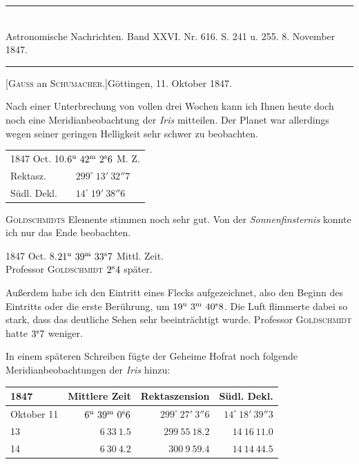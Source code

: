 \clearpage
{}
\begin{center}
\rule{0.55\linewidth}{0.4pt}\\[2pt]
Astronomische Nachrichten. Band XXVI. Nr. 616. S. 241 u. 255. 8. November 1847.\\[2pt]
\rule{0.55\linewidth}{0.4pt}
\end{center}
\begin{center}[\textsc{Gauss} an \textsc{Schumacher}.]\quad Göttingen, 11. Oktober 1847.\end{center}

Nach einer Unterbrechung von vollen drei Wochen kann ich Ihnen heute doch noch eine Meridianbeobachtung der \emph{Iris} mitteilen. Der Planet war allerdings wegen seiner geringen Helligkeit sehr schwer zu beobachten.

\begin{center}
\begin{tabular}{ll}
\multicolumn{2}{l}{1847 Oct. 10.\quad $6^{\rm u}\ 42^{\rm m}\ 2^{\rm s}6$ M. Z.} \\
Rektasz. & $299^\circ\ 13'\ 32''7$ \\
Südl. Dekl. & $14^\circ\ 19'\ 38''6$ \\
\end{tabular}
\end{center}

\textsc{Goldschmidts} Elemente stimmen noch sehr gut. Von der \emph{Sonnenfinsternis} konnte ich nur das Ende beobachten.

\begin{center}
1847 Oct. 8.\quad $21^{\rm u}\ 39^{\rm m}\ 33^{\rm s}7$ Mittl. Zeit.\\
Professor \textsc{Goldschmidt} $2^{\rm s}4$ später.
\end{center}

Außerdem habe ich den Eintritt eines Flecks aufgezeichnet, also den Beginn des Eintritts oder die erste Berührung, um $19^{\rm u}\ 3^{\rm m}\ 40^{\rm s}8$. Die Luft flimmerte dabei so stark, dass das deutliche Sehen sehr beeinträchtigt wurde. Professor \textsc{Goldschmidt} hatte $3^{\rm s}7$ weniger.

In einem späteren Schreiben fügte der Geheime Hofrat noch folgende Meridianbeobachtungen der \emph{Iris} hinzu:

\begin{center}
\setlength{\tabcolsep}{4pt}
\begin{tabular}{l|r|r|r}
1847 & Mittlere Zeit & Rektaszension & Südl. Dekl. \\\hline
Oktober 11 & $6^{\rm u}\ 39^{\rm m}\ 0^{\rm s}6$ & $299^\circ\ 27'\ 3''6$ & $14^\circ\ 18'\ 39''3$ \\
\hfill 13 & $6\ 33\ 1.5$ & $299\ 55\ 18.2$ & $14\ 16\ 11.0$ \\
\hfill 14 & $6\ 30\ 4.2$ & $300\ 9\ 59.4$ & $14\ 14\ 44.5$ \\
\end{tabular}
\end{center}

